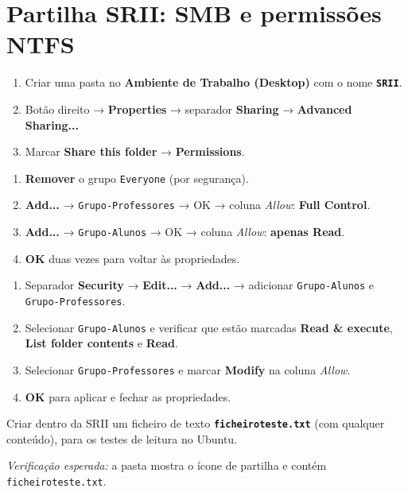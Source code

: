 
\section[Partilha SRII: SMB e permissões NTFS]{Partilha SRII: SMB e permissões NTFS}


\begin{enumerate}
\item Criar uma pasta no \textbf{Ambiente de Trabalho (Desktop)} com o nome \textbf{\texttt{SRII}}.
\item Botão direito → \textbf{Properties} → separador \textbf{Sharing} → \textbf{Advanced Sharing...}
\item Marcar \textbf{Share this folder} → \textbf{Permissions}.
\end{enumerate}


\begin{enumerate}
\item \textbf{Remover} o grupo \texttt{Everyone} (por segurança).
\item \textbf{Add...} → \texttt{Grupo-Professores} → OK → coluna \emph{Allow}: \textbf{Full Control}.
\item \textbf{Add...} → \texttt{Grupo-Alunos} → OK → coluna \emph{Allow}: \textbf{apenas Read}.
\item \textbf{OK} duas vezes para voltar às propriedades.
\end{enumerate}


\begin{enumerate}
\item Separador \textbf{Security} → \textbf{Edit...} → \textbf{Add...} → adicionar \texttt{Grupo-Alunos} e \texttt{Grupo-Professores}.
\item Selecionar \texttt{Grupo-Alunos} e verificar que estão marcadas \textbf{Read \& execute}, \textbf{List folder contents} e \textbf{Read}.
\item Selecionar \texttt{Grupo-Professores} e marcar \textbf{Modify} na coluna \emph{Allow}.
\item \textbf{OK} para aplicar e fechar as propriedades.
\end{enumerate}


Criar dentro da SRII um ficheiro de texto \textbf{\texttt{ficheiroteste.txt}} (com qualquer conteúdo), para os testes de leitura no Ubuntu.

\emph{Verificação esperada:} a pasta mostra o ícone de partilha e contém \texttt{ficheiroteste.txt}.

